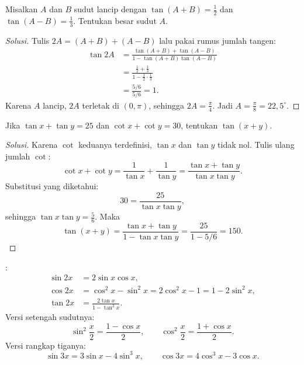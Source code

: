 \documentclass[12pt]{scrartcl}
\begin{document}
\begin{example}[OSK 2011]
Misalkan $A$ dan $B$ sudut lancip dengan $\tan(A+B) = \frac{1}{2}$ dan
$\tan(A-B) = \frac{1}{3}$. Tentukan besar sudut $A$.
\end{example}
\begin{proof}[Solusi]
Tulis $2A = (A+B) + (A-B)$ lalu pakai rumus jumlah tangen:
\begin{align*}
\tan 2A &= \frac{\tan(A+B) + \tan(A-B)}{1 - \tan(A+B)\tan(A-B)} \\
&= \frac{\frac{1}{2} + \frac{1}{3}}{1 - \frac{1}{2} \cdot \frac{1}{3}} \\
&= \frac{5/6}{5/6} = 1.
\end{align*}
Karena $A$ lancip, $2A$ terletak di $(0, \pi)$, sehingga $2A = \frac{\pi}{4}$.
Jadi $A = \frac{\pi}{8} = 22{,}5^{\circ}$.
\end{proof}

\begin{example}[OSP 2009]
Jika $\tan x + \tan y = 25$ dan $\cot x + \cot y = 30$, tentukan $\tan(x+y)$.
\end{example}
\begin{proof}[Solusi]
Karena $\cot$ keduanya terdefinisi, $\tan x$ dan $\tan y$ tidak nol.
Tulis ulang jumlah $\cot$:
\[ \cot x + \cot y = \frac{1}{\tan x} + \frac{1}{\tan y}
= \frac{\tan x + \tan y}{\tan x \tan y}. \]
Substitusi yang diketahui:
\[ 30 = \frac{25}{\tan x \tan y}, \]
sehingga $\tan x \tan y = \frac{5}{6}$. Maka
\[ \tan(x+y) = \frac{\tan x + \tan y}{1 - \tan x \tan y}
= \frac{25}{1 - 5/6} = 150. \]
\end{proof}

\begin{theorem}
:
\begin{align*}
\sin 2x &= 2\sin x \cos x, \\
\cos 2x &= \cos^2 x - \sin^2 x = 2\cos^2 x - 1 = 1 - 2\sin^2 x, \\
\tan 2x &= \frac{2\tan x}{1 - \tan^2 x}.
\end{align*}
Versi setengah sudutnya:
\[ \sin^2 \frac{x}{2} = \frac{1 - \cos x}{2}, \qquad
\cos^2 \frac{x}{2} = \frac{1 + \cos x}{2}. \]
Versi rangkap tiganya:
\[ \sin 3x = 3\sin x - 4\sin^3 x, \qquad \cos 3x = 4\cos^3 x - 3\cos x. \]
\end{theorem}
\end{document}
